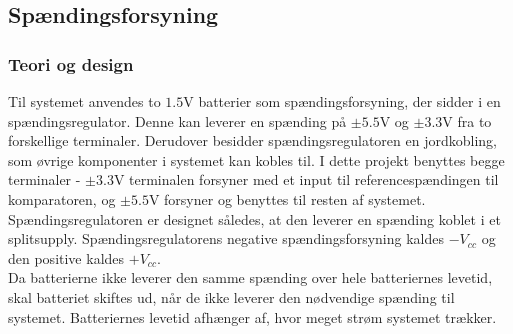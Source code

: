 \subsection{Spændingsforsyning}
\subsubsection{Teori og design}
Til systemet anvendes to $1.5$V batterier som spændingsforsyning, der sidder i en spændingsregulator. Denne kan leverer en spænding på $\pm5.5$V og $\pm3.3$V fra to forskellige terminaler. Derudover besidder spændingsregulatoren en jordkobling, som øvrige komponenter i systemet kan kobles til. I dette projekt benyttes begge terminaler - $\pm3.3$V terminalen forsyner med et input til referencespændingen til komparatoren, og $\pm5.5$V forsyner og benyttes til resten af systemet. Spændingsregulatoren er designet således, at den leverer en spænding koblet i et splitsupply. Spændingsregulatorens negative spændingsforsyning kaldes $-V_{cc}$ og den positive kaldes $+V_{cc}$. \\%
Da batterierne ikke leverer den samme spænding over hele batteriernes levetid, skal batteriet skiftes ud, når de ikke leverer den nødvendige spænding til systemet. Batteriernes levetid afhænger af, hvor meget strøm systemet trækker. %

